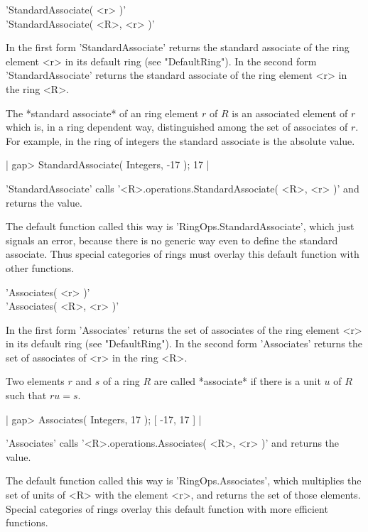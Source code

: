 
'StandardAssociate( <r> )' \\
'StandardAssociate( <R>, <r> )'

In the first form  'StandardAssociate' returns  the standard associate of
the ring element  <r> in  its default  ring (see  "DefaultRing").  In the
second form  'StandardAssociate'  returns  the standard  associate of the
ring element <r> in the ring <R>.

The  *standard associate* of an ring  element $r$ of $R$ is an associated
element of $r$ which is, in a ring dependent way, distinguished among the
set  of  associates  of  $r$.  For example, in the ring  of integers  the
standard associate is the absolute value.

|    gap> StandardAssociate( Integers, -17 );
    17 |

'StandardAssociate' calls '<R>.operations.StandardAssociate( <R>, <r> )'
and returns the value.

The   default  function called this  way  is 'RingOps.StandardAssociate',
which  just signals an error,  because there  is no  generic  way even to
define the standard associate.   Thus  special categories  of rings  must
overlay this default function with other functions.


'Associates( <r> )' \\
'Associates( <R>, <r> )'

In the first form 'Associates' returns the set of associates of the ring
element <r> in its default ring (see "DefaultRing").  In the second form
'Associates' returns the set of associates of <r> in the ring <R>.

Two elements $r$ and $s$ of a ring $R$ are called *associate* if there is
a unit  $u$ of  $R$ such  that $r u = s$.

|    gap> Associates( Integers, 17 );
    [ -17, 17 ] |

'Associates' calls  '<R>.operations.Associates( <R>,  <r> )' and  returns
the value.

The  default function    called this way   is 'RingOps.Associates', which
multiplies the set of units of <R> with the element  <r>, and returns the
set of those elements.  Special categories of rings overlay  this default
function with more efficient functions.

